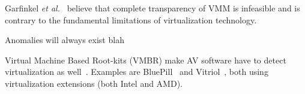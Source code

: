 Garfinkel {\em et al.}~\cite{garfinkel2007} believe that complete
transparency of VMM is infeasible and is contrary to the fundamental limitations
of virtualization technology.

Anomalies will always exist blah

Virtual Machine Based Root-kits (VMBR) make AV software have to detect
virtualization as well~\cite{thompson, ferrie2007}. Examples are
BluePill~\cite{bluepill} and Vitriol~\cite{vitriol}, both using virtualization
extensions (both Intel and AMD).

